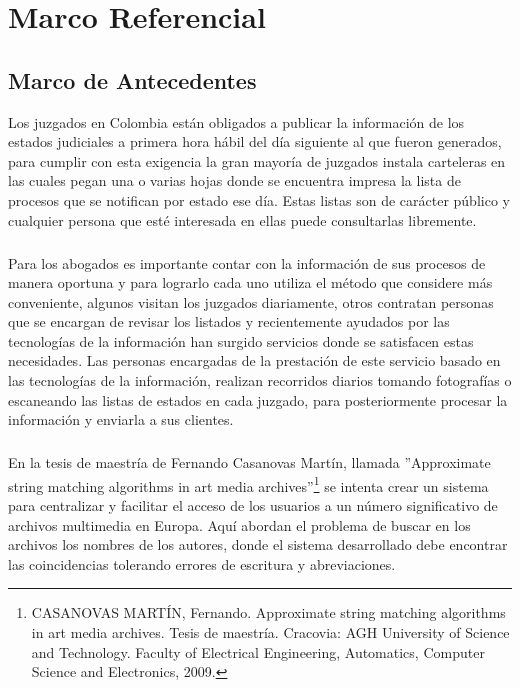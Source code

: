 \chapter{Marco Referencial}
\label{sec:marco}

\section{Marco de Antecedentes}
Los juzgados en Colombia est\'an obligados a publicar la informaci\'on de 
los estados judiciales a primera hora h\'abil del d\'ia siguiente al que 
fueron generados, para cumplir con esta exigencia la gran mayor\'ia de 
juzgados instala carteleras en las cuales pegan una o varias hojas 
donde se encuentra impresa la lista de procesos que se notifican por 
estado ese d\'ia. Estas listas son de car\'acter p\'ublico y cualquier persona
que est\'e interesada en ellas puede consultarlas libremente.
\paragraph{}
Para los abogados es importante contar con la informaci\'on de sus 
procesos de manera oportuna y para lograrlo cada uno utiliza el m\'etodo 
que considere m\'as conveniente, algunos visitan los juzgados diariamente,
otros contratan personas que se encargan de revisar los listados y 
recientemente ayudados por las tecnolog\'ias de la informaci\'on han surgido
servicios donde se satisfacen estas necesidades. Las personas encargadas
de la prestaci\'on de este servicio basado en las tecnolog\'ias de la 
informaci\'on, realizan recorridos diarios tomando fotograf\'ias o escaneando
las listas de estados en cada juzgado, para posteriormente procesar la 
informaci\'on y enviarla a sus clientes.
\paragraph{}
En la tesis de maestr\'ia de Fernando Casanovas Mart\'in, llamada 
''Approximate string matching algorithms in art media archives''\footnote{CASANOVAS MART\'IN, Fernando. Approximate string matching algorithms in art media archives.
Tesis de maestr\'ia. Cracovia:  AGH University of Science and Technology.
Faculty of Electrical Engineering, Automatics, Computer Science and Electronics, 2009.} se 
intenta crear un sistema para centralizar y facilitar el acceso de los 
usuarios a un n\'umero significativo de archivos multimedia en Europa. 
Aqu\'i abordan el problema de buscar en los archivos los nombres de los 
autores, donde el sistema desarrollado debe encontrar las coincidencias
tolerando errores de escritura y abreviaciones.
